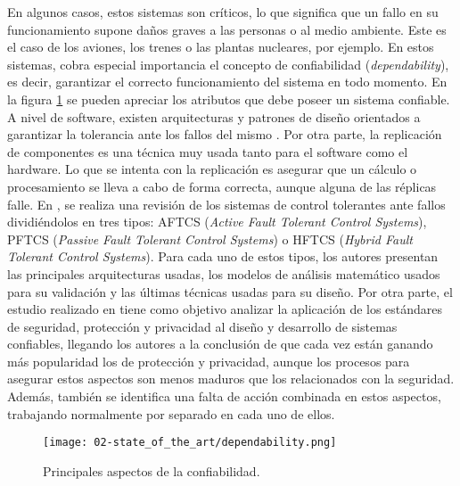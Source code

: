 En algunos casos, estos sistemas son críticos, lo que significa que un fallo en
su funcionamiento supone daños graves a las personas o al medio ambiente. Este
es el caso de los aviones, los trenes o las plantas nucleares, por ejemplo. En
estos sistemas, cobra especial importancia el concepto de confiabilidad
(\textit{dependability}), es decir, garantizar el correcto funcionamiento del
sistema en todo momento. En la figura \ref{fig:02-dependability} se pueden
apreciar los atributos que debe poseer un sistema confiable. A nivel de
software, existen arquitecturas y patrones de diseño orientados a garantizar la
tolerancia ante los fallos del mismo
\cite{pullum_software_2001}\cite{randell_system_1975}. Por otra parte, la
replicación de componentes \cite{hutchison_dependable_2006} es una técnica muy
usada tanto para el software como el hardware. Lo que se intenta con la
replicación es asegurar que un cálculo o procesamiento se lleva a cabo de forma
correcta, aunque alguna de las réplicas falle. En \cite{amin_review_2019}, se
realiza una revisión de los sistemas de control tolerantes ante fallos
dividiéndolos en tres tipos: AFTCS (\textit{Active Fault Tolerant Control
  Systems}), PFTCS (\textit{Passive Fault Tolerant Control Systems}) o HFTCS
(\textit{Hybrid Fault Tolerant Control Systems}). Para cada uno de estos tipos,
los autores presentan las principales arquitecturas usadas, los modelos de
análisis matemático usados para su validación y las últimas técnicas usadas para
su diseño. Por otra parte, el estudio realizado en \cite{shan_survey_2019} tiene
como objetivo analizar la aplicación de los estándares de seguridad, protección
y privacidad al diseño y desarrollo de sistemas confiables, llegando los autores
a la conclusión de que cada vez están ganando más popularidad los de protección
y privacidad, aunque los procesos para asegurar estos aspectos son menos maduros
que los relacionados con la seguridad. Además, también se identifica una falta
de acción combinada en estos aspectos, trabajando normalmente por separado en
cada uno de ellos.

\begin{figure}
  \centering
  \texttt{[image: 02-state\_of\_the\_art/dependability.png]}
  \caption{Principales aspectos de la confiabilidad.}
  \label{fig:02-dependability}
\end{figure}

